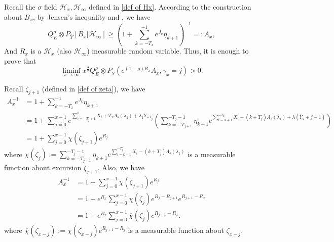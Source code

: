 \documentclass[]{article}
\makeatletter
\numberwithin{equation}{section}
\renewenvironment{proof}[1][\proofname]{%
	\par\pushQED{\qed}\normalfont%
	\topsep6\p@\@plus6\p@\relax
	\trivlist\item[\hskip\labelsep\bfseries#1\@addpunct{.}]%
	\ignorespaces
}{%
	\popQED\endtrivlist\@endpefalse
}
\theoremstyle{thmstyleone}%
\theoremstyle{thmstyletwo}%
\theoremstyle{thmstylethree}%
\theoremstyle{thmstylefour}%
\theoremstyle{thmstylefive}%
\theoremstyle{thmstylesix}%
\makeatother
\begin{document}
	\begin{proof}[Proof of \Cref{lemma of weakly 1}]
		Recall the $\sigma$ field $\mathcal{H}_x,\mathcal{H}_\infty$ defined in \cref{def of Hx}.
		According to the construction about $B_x$, by Jensen's inequality and , we have
		\begin{equation}
			Q_E^{\rho}\otimes P_{\overline{Y}}
			[B_x|\mathcal{H}_\infty]
			\geqslant
			\left(
			1+\sum_{k=-T_x}^{-1} e^{J_k}\eta_{k+1}
			\right)^{-1}=:A_x,
		\end{equation}
		And $R_x$ is a $\mathcal{H}_x$ (also $\mathcal{H}_\infty$) measurable random variable. Thus, it is enough to prove that
		\begin{equation}
			\liminf\limits_{x\rightarrow\infty} x^{\frac{3}{2}}
			Q_E^\rho\otimes P_{\overline{Y}}
			\left(e^{(1-\rho)R_x}A_x,\gamma_x=j\right) >0.
		\end{equation}
		
		Recall $\zeta_{j+1}$ (defined in \cref{def of zeta}), we have
		\begin{align}
			A_x^{-1}
			&= 1+\sum_{k=-T_x}^{-1} e^{J_k}\eta_{k+1}
			\nonumber\\
			&= 1+\sum_{j=0}^{x-1} e^{\sum\limits_{i=-T_j+1}^0 X_i +T_x\Lambda_s(\lambda_1)+\lambda_1 \overline{Y}_{-T_j}} 
			\left(\sum_{k=-T_{j+1}}^{-T_j-1} \eta_{k+1} e^{\sum\limits_{i=k+1}^{-T_x} X_i - (k+T_j)\Lambda_s(\lambda_1)+\lambda(\overline{Y}_{k}+j-1)} 
			\right)
			\nonumber\\
			&=1+\sum_{j=0}^{x-1}
			\chi(\zeta_{j+1})e^{R_j} \nonumber
		\end{align}
		where $\chi(\zeta_{j}):= \sum\limits_{k=-T_{j+1}}^{-T_j-1} \eta_{k+1} e^{\sum\limits_{i=k+1}^{-T_j} X_i - (k+T_j)\Lambda_s(\lambda_1)}$ is a measurable function about excursion $\zeta_{j+1}$.
		Also, we have
		\begin{align}
			A_x^{-1}&= 1+\sum_{j=0}^{x-1}
			\chi(\zeta_{j+1})e^{R_j}\nonumber\\
			&=
			1+ e^{R_x} \sum_{j=0}^{x-1} \chi(\zeta_{j})e^{R_{j}-R_{j+1}}e^{R_{j+1}-R_x}
			\nonumber\\
			&=1+ e^{R_x} \sum_{j=0}^{x-1} \overline{\chi}(\zeta_{j}) e^{R_{j+1}-R_x}.
		\end{align}
		where $\overline{\chi}(\zeta_{x-j}):=\chi(\zeta_{x-j})e^{R_{j+1}-R_j}$ is a measurable function about $\zeta_{x-j}$.
		

\end{proof}
\end{document}
